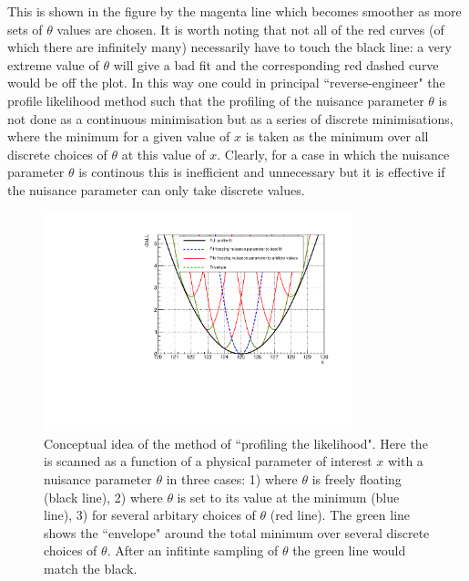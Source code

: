This is shown in the figure by the magenta line which becomes smoother as more sets of $\theta$ values are chosen. It is worth noting that not all of the red curves (of which there are infinitely many) necessarily have to touch the black line: a very extreme value of $\theta$ will give a bad fit and the corresponding red dashed curve would be off the plot. In this way one could in principal ``reverse-engineer" the profile likelihood method such that the profiling of the nuisance parameter $\theta$ is not done as a continuous minimisation but as a series of discrete minimisations, where the minimum \NLL for a given value of $x$ is taken as the minimum \NLL over all discrete choices of $\theta$ at this value of $x$. Clearly, for a case in which the nuisance parameter $\theta$ is continous this is inefficient and unnecessary but it is effective if the nuisance parameter can only take discrete values.

\begin{figure}
\begin{center}
  \includegraphics[width=0.8\textwidth]{analysis/plots/envelope_explain.pdf}
  \caption[Conceptual idea of the method of likelihood profiling]{Conceptual idea of the method of ``profiling the likelihood". Here the \NLL is scanned as a function of a physical parameter of interest $x$ with a nuisance parameter $\theta$ in three cases: 1) where $\theta$ is freely floating (black line), 2) where $\theta$ is set to its value at the \NLL minimum (blue line), 3) for several arbitary choices of $\theta$ (red line). The green line shows the ``envelope" around the total minimum over several discrete choices of $\theta$. After an infitinte sampling of $\theta$ the green line would match the black.}
  \label{fig:envelope_explain1}
\end{center}
\end{figure}

